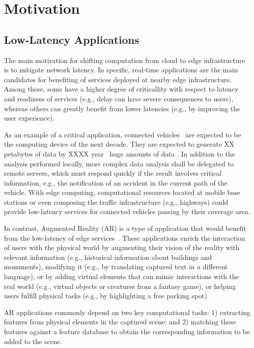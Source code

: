 \section{Motivation}\label{sec:motivation}

\subsection{Low-Latency Applications}

The main motivation for shifting computation from cloud to edge infrastructure is to mitigate network latency. In specific, real-time applications are the main candidates for benefiting of services deployed at nearby edge infrastructure. Among these, some have a higher degree of criticallity with respect to latency and readiness of services (e.g., delay can have severe consequences to users), whereas others can greatly benefit from lower latencies (e.g., by improving the user experience).

As an example of a critical application, connected vehicles~\cite{} are expected to be the computing device of the next decade. They are expected to generate XX petabytes of data by XXXX year~\cite{connectedCars} huge amounts of data %
. In addition to the analysis performed locally, more complex data analysis shall be delegated to remote servers, which must respond quickly if the result involves critical information, e.g., the notification of an accident in the current path of the vehicle. With edge computing, computational resources located at mobile base stations or even composing the traffic infrastructure (e.g., highways) could provide low-latency services for connected vehicles passing by their coverage area.

In contrast, Augmented Reality (AR) is a type of application that would benefit from the low-latency of edge services~\cite{hu2015mobile}. These applications enrich the interaction of users with the physical
world by augmenting their vision of the reality with relevant information (e.g., historical information about buildings and monuments), modifying it (e.g., by translating captured text in a different language), or by adding virtual elements that can mimic interactions with the real world (e.g., virtual objects or creatures
from a fantasy game), or helping users fulfill physical tasks (e.g., by highlighting a free parking spot) 

AR applications commonly depend on two key computational tasks: 1) extracting features from physical elements in the captured scene; and 2) matching these features against a feature database to obtain the corresponding information to be added to the scene. 

